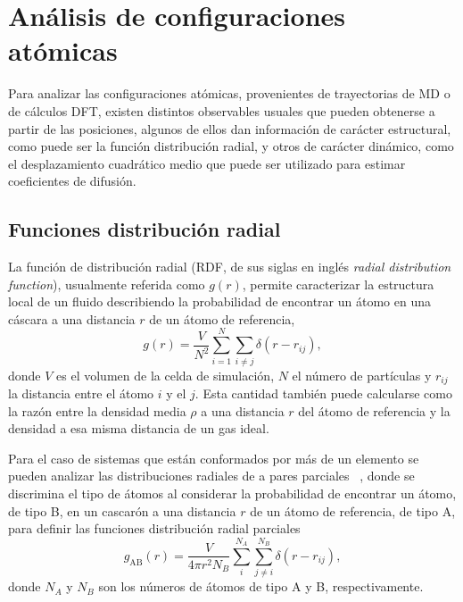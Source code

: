 \section{Análisis de configuraciones atómicas}\label{s:observables}

Para analizar las configuraciones atómicas, provenientes de trayectorias de MD
o de cálculos DFT, existen distintos observables usuales que pueden obtenerse
a partir de las posiciones, algunos de ellos dan información de carácter 
estructural, como puede ser la función distribución radial, y otros de carácter 
dinámico, como el desplazamiento cuadrático medio que puede ser utilizado para 
estimar coeficientes de difusión.

\subsection{Funciones distribución radial}\label{ss:rdf}

La función de distribución radial (RDF, de sus siglas en inglés \textit{radial 
distribution function}), usualmente referida como $g(r)$, permite caracterizar la
estructura local de un fluido describiendo la probabilidad de encontrar un átomo
en una cáscara a una distancia $r$ de un átomo de referencia,
\begin{equation}\label{eq:rdf}
    g(r) = \frac{V}{N^2} \sum_{i=1}^N \sum_{i \neq j} \delta(r - r_{ij}),
\end{equation}
donde $V$ es el volumen de la celda de simulación, $N$ el número de partículas y 
$r_{ij}$ la distancia entre el átomo $i$ y el $j$. Esta cantidad también puede 
calcularse como la razón entre la densidad media $\rho$ a una distancia $r$ del 
átomo de referencia y la densidad a esa misma distancia de un gas ideal.

Para el caso de sistemas que están conformados por más de un elemento se pueden 
analizar las distribuciones radiales de a pares parciales ~\cite{lamparter1995}, 
donde se discrimina el tipo de átomos al considerar la probabilidad de encontrar 
un átomo, de tipo B, en un cascarón a una distancia $r$ de un átomo de referencia, 
de tipo A, para definir las funciones distribución radial parciales
\begin{equation}\label{eq:prdf}
    g_{\text{AB}}(r) = \frac{V}{4 \pi r^2 N_B} \sum_{i}^{N_A} \sum_{j\neq i}^{N_B} \delta(r - r_{ij}),
\end{equation}
donde $N_A$ y $N_B$ son los números de átomos de tipo A y B, respectivamente. 

